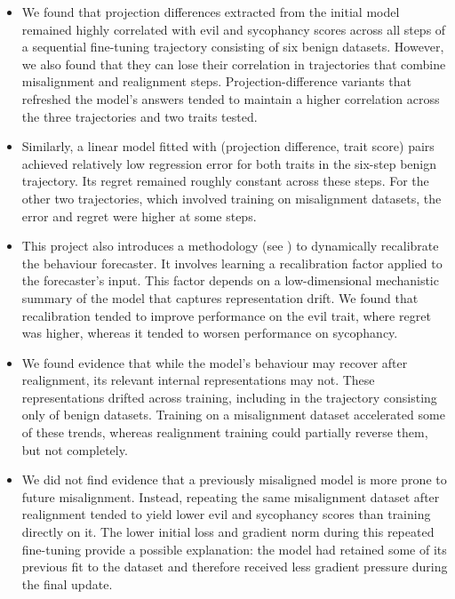\begin{itemize}
    \item We found that projection differences extracted from the initial model remained highly correlated with evil and sycophancy scores across all steps of a sequential fine-tuning trajectory consisting of six benign datasets. However, we also found that they can lose their correlation in trajectories that combine misalignment and realignment steps. Projection-difference variants that refreshed the model's answers tended to maintain a higher correlation across the three trajectories and two traits tested.
    \item Similarly, a linear model fitted with (projection difference, trait score) pairs achieved relatively low regression error for both traits in the six-step benign trajectory. Its regret remained roughly constant across these steps. For the other two trajectories, which involved training on misalignment datasets, the error and regret were higher at some steps.
    \item This project also introduces a methodology (see ) to dynamically recalibrate the behaviour forecaster. It involves learning a recalibration factor applied to the forecaster's input. This factor depends on a low-dimensional mechanistic summary of the model that captures representation drift. We found that recalibration tended to improve performance on the evil trait, where regret was higher, whereas it tended to worsen performance on sycophancy.
    \item We found evidence that while the model's behaviour may recover after realignment, its relevant internal representations may not. These representations drifted across training, including in the trajectory consisting only of benign datasets. Training on a misalignment dataset accelerated some of these trends, whereas realignment training could partially reverse them, but not completely.
    \item We did not find evidence that a previously misaligned model is more prone to future misalignment. Instead, repeating the same misalignment dataset after realignment tended to yield lower evil and sycophancy scores than training directly on it. The lower initial loss and gradient norm during this repeated fine-tuning provide a possible explanation: the model had retained some of its previous fit to the dataset and therefore received less gradient pressure during the final update.
\end{itemize}

